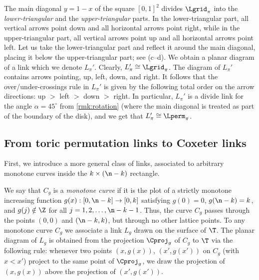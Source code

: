 The main diagonal $y=1-x$ of the square $[0,1]^2$ divides $\Lgrid_\pi$ into the \emph{lower-triangular} and the \emph{upper-triangular} parts. In the lower-triangular part, all vertical arrows point down and all horizontal arrows point right, while in the upper-triangular part, all vertical arrows point up and all horizontal arrows point left. 
Let us take the lower-triangular part and reflect it around the main diagonal, placing it below the upper-triangular part; see (c--d). We obtain a planar diagram of a link which we denote $L_\pi'$. Clearly, $L_\pi'\cong \Lgrid_\pi$. The diagram of $L_\pi'$ contains arrows pointing, up, left, down, and right. It follows that the over/under-crossings rule  in $L_\pi'$ is given by the following total order on the arrow directions: up $>$ left $>$ down $>$ right. In particular, $L_\pi'$ is a divide link for the angle $\alpha=45^\circ$ from \cref{rmk:rotation} (where the main diagonal is treated as part of the boundary of the disk), and we get that $L_\pi'\cong\Lperm_\pi$. 
%

\subsection{From toric permutation links to Coxeter links}\label{sec:tor_to_Cox}
First, we introduce a more general class of links, associated to arbitrary monotone curves inside the $k\times(\n-k)$ rectangle.

%
%
We say that $C_g$ is a \emph{monotone curve} if it is the plot of a strictly monotone increasing function $g(x):[0,\n-k]\to[0,k]$ satisfying $g(0)=0$, $g(\n-k)=k$, and $g(j)\notin\Z$ for all $j=1,2,\dots,\n-k-1$. Thus, the curve $C_g$ passes through the points $(0,0)$ and $(\n-k,k)$, but through no other lattice points. To any monotone curve $C_g$ we associate a link $L_g$ drawn on the surface of $\T$. The planar diagram of $L_g$ is obtained from the projection $\Cproj_g$ of $C_g$ to $\T$ via the following rule: whenever  two points $(x,g(x))$, $(x',g(x'))$ on $C_g$ (with $x<x'$) project to the same point of $\Cproj_g$, we draw the projection of $(x,g(x))$ above the projection of $(x',g(x'))$. 

